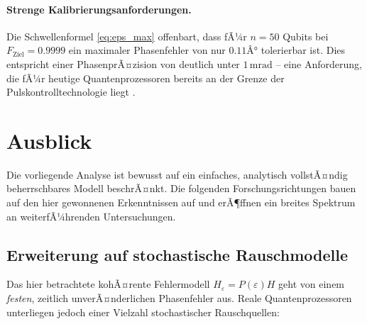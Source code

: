 ﻿\documentclass[11pt,a4paper]{article}
\theoremstyle{definition}
\newcommand{\eps}{\varepsilon}
\newcommand{\Heps}{H_{\!\varepsilon}}
\begin{document}
\paragraph{Strenge Kalibrierungsanforderungen.}
Die Schwellenformel \eqref{eq:eps_max} offenbart, dass fÃ¼r $n=50$ Qubits
bei $F_{\mathrm{Ziel}}=0.9999$ ein maximaler Phasenfehler von nur $0.11Â°$
tolerierbar ist.  Dies entspricht einer PhasenprÃ¤zision von deutlich unter
$1\,\mathrm{mrad}$ -- eine Anforderung, die fÃ¼r heutige Quantenprozessoren
bereits an der Grenze der Pulskontrolltechnologie liegt \cite{Rol2019}.

\section{Ausblick}
\label{sec:outlook}

Die vorliegende Analyse ist bewusst auf ein einfaches, analytisch vollstÃ¤ndig
beherrschbares Modell beschrÃ¤nkt.  Die folgenden Forschungsrichtungen bauen
auf den hier gewonnenen Erkenntnissen auf und erÃ¶ffnen ein breites Spektrum
an weiterfÃ¼hrenden Untersuchungen.

\subsection{Erweiterung auf stochastische Rauschmodelle}
\label{subsec:stochastic}

Das hier betrachtete kohÃ¤rente Fehlermodell $\Heps = P(\eps)H$ geht von einem
\emph{festen}, zeitlich unverÃ¤nderlichen Phasenfehler aus.  Reale Quantenprozessoren
unterliegen jedoch einer Vielzahl stochastischer Rauschquellen:
\end{document}
